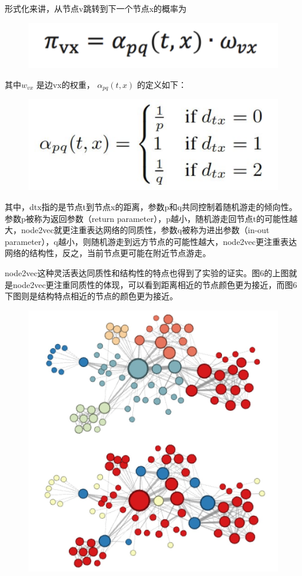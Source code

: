 \documentclass[12pt]{article}
\begin{document}
形式化来讲，从节点v跳转到下一个节点x的概率为
\begin{figure}[H]
    \centering
    \includegraphics[width=.6\textwidth]{fig/Graph_Embedding_Node2Vec_Trans_Prob_2.png}
\end{figure}

其中$w_{vx}$ 是边vx的权重， $\alpha_{pq}(t,x)$ 的定义如下：
\begin{figure}[H]
    \centering
    \includegraphics[width=.6\textwidth]{fig/Graph_Embedding_Node2Vec_Trans_Prob_3.png}
\end{figure}

其中，dtx指的是节点t到节点x的距离，参数p和q共同控制着随机游走的倾向性。参数p被称为返回参数（return parameter），p越小，随机游走回节点t的可能性越大，node2vec就更注重表达网络的同质性，参数q被称为进出参数（in-out parameter），q越小，则随机游走到远方节点的可能性越大，node2vec更注重表达网络的结构性，反之，当前节点更可能在附近节点游走。

node2vec这种灵活表达同质性和结构性的特点也得到了实验的证实。图6的上图就是node2vec更注重同质性的体现，可以看到距离相近的节点颜色更为接近，而图6下图则是结构特点相近的节点的颜色更为接近。
\begin{figure}[H]
    \centering
    \includegraphics[width=.6\textwidth]{fig/Graph_Embedding_Node2Vec_Result_Example.jpg}
\end{figure}
\end{document}
